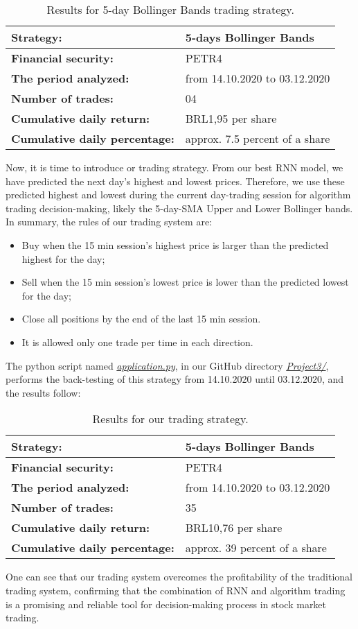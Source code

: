 \begin{table}[H]
\centering
\begin{tabular}{ |l||l| }
\hline
\textbf{Strategy:} & 5-days Bollinger Bands\\
\hline
\textbf{Financial security:} & PETR4\\
\hline
\textbf{The period analyzed:} & from 14.10.2020 to 03.12.2020\\
\hline
\textbf{Number of trades:} & 04\\
\hline
\textbf{Cumulative daily return:} & BRL1,95 per share\\
\hline
\textbf{Cumulative daily percentage:} & approx. 7.5 percent of a share\\
\hline
\end{tabular}
\caption{Results for 5-day Bollinger Bands trading strategy.}
\end{table}

Now, it is time to introduce or trading strategy. From our best RNN model, we have predicted the next day's highest and lowest prices. Therefore, we use these predicted highest and lowest during the current day-trading session for algorithm trading decision-making, likely the 5-day-SMA Upper and Lower Bollinger bands. In summary, the rules of our trading system are:

\begin{itemize}
    \item Buy when the 15 min session's highest price is larger than the predicted highest for the day;
    \item Sell when the 15 min session's lowest price is lower than the predicted lowest for the day;
    \item Close all positions by the end of the last 15 min session.
    \item It is allowed only one trade per time in each direction.
\end{itemize}

The python script named \href{https://github.com/fabiorodp/UiO-FYS-STK4155/tree/master/Project3/application.py}{\textit{application.py}}, in our GitHub directory \href{https://github.com/fabiorodp/UiO-FYS-STK4155/tree/master/Project3/}{\textit{Project3/}}, performs the back-testing of this strategy from 14.10.2020 until 03.12.2020, and the results follow:

\begin{table}[H]
\centering
\begin{tabular}{ |l||l| }
\hline
\textbf{Strategy:} & 5-days Bollinger Bands\\
\hline
\textbf{Financial security:} & PETR4\\
\hline
\textbf{The period analyzed:} & from 14.10.2020 to 03.12.2020\\
\hline
\textbf{Number of trades:} & 35\\
\hline
\textbf{Cumulative daily return:} & BRL10,76 per share\\
\hline
\textbf{Cumulative daily percentage:} & approx. 39 percent of a share\\
\hline
\end{tabular}
\caption{Results for our trading strategy.}
\end{table}

One can see that our trading system overcomes the profitability of the traditional trading system, confirming that the combination of RNN and algorithm trading is a promising and reliable tool for decision-making process in stock market trading.
